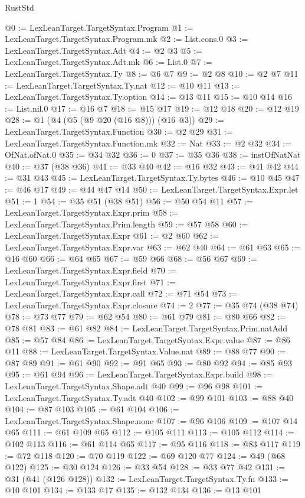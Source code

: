 \begin{lexlean}{RustStd}
\begin{coremodule}
@0 := LexLeanTarget.TargetSyntax.Program
@1 := LexLeanTarget.TargetSyntax.Program.mk
@2 := List.cons.{0}
@3 := LexLeanTarget.TargetSyntax.Adt
@4 := @2 @3
@5 := LexLeanTarget.TargetSyntax.Adt.mk
@6 := List.{0}
@7 := LexLeanTarget.TargetSyntax.Ty
@8 := @6 @7
@9 := @2 @8
@10 := @2 @7
@11 := LexLeanTarget.TargetSyntax.Ty.nat
@12 := @10 @11
@13 := LexLeanTarget.TargetSyntax.Ty.option
@14 := @13 @11
@15 := @10 @14
@16 := List.nil.{0}
@17 := @16 @7
@18 := @15 @17
@19 := @12 @18
@20 := @12 @19
@28 := @1 (@4 (@5 (@9 @20 (@16 @8))) (@16 @3))
@29 := LexLeanTarget.TargetSyntax.Function
@30 := @2 @29
@31 := LexLeanTarget.TargetSyntax.Function.mk
@32 := Nat
@33 := @2 @32
@34 := OfNat.ofNat.{0}
@35 := @34 @32
@36 := 0
@37 := @35 @36
@38 := instOfNatNat
@40 := @37 (@38 @36)
@41 := @33 @40
@42 := @16 @32
@43 := @41 @42
@44 := @31 @43
@45 := LexLeanTarget.TargetSyntax.Ty.bytes
@46 := @10 @45
@47 := @46 @17
@49 := @44 @47 @14
@50 := LexLeanTarget.TargetSyntax.Expr.let
@51 := 1
@54 := @35 @51 (@38 @51)
@56 := @50 @54 @11
@57 := LexLeanTarget.TargetSyntax.Expr.prim
@58 := LexLeanTarget.TargetSyntax.Prim.length
@59 := @57 @58
@60 := LexLeanTarget.TargetSyntax.Expr
@61 := @2 @60
@62 := LexLeanTarget.TargetSyntax.Expr.var
@63 := @62 @40
@64 := @61 @63
@65 := @16 @60
@66 := @64 @65
@67 := @59 @66
@68 := @56 @67
@69 := LexLeanTarget.TargetSyntax.Expr.field
@70 := LexLeanTarget.TargetSyntax.Expr.first
@71 := LexLeanTarget.TargetSyntax.Expr.call
@72 := @71 @54
@73 := LexLeanTarget.TargetSyntax.Expr.closure
@74 := 2
@77 := @35 @74 (@38 @74)
@78 := @73 @77
@79 := @62 @54
@80 := @61 @79
@81 := @80 @66
@82 := @78 @81
@83 := @61 @82
@84 := LexLeanTarget.TargetSyntax.Prim.natAdd
@85 := @57 @84
@86 := LexLeanTarget.TargetSyntax.Expr.value
@87 := @86 @11
@88 := LexLeanTarget.TargetSyntax.Value.nat
@89 := @88 @77
@90 := @87 @89
@91 := @61 @90
@92 := @91 @65
@93 := @80 @92
@94 := @85 @93
@95 := @61 @94
@96 := LexLeanTarget.TargetSyntax.Expr.build
@98 := LexLeanTarget.TargetSyntax.Shape.adt @40
@99 := @96 @98
@101 := LexLeanTarget.TargetSyntax.Ty.adt @40
@102 := @99 @101
@103 := @88 @40
@104 := @87 @103
@105 := @61 @104
@106 := LexLeanTarget.TargetSyntax.Shape.none
@107 := @96 @106
@109 := @107 @14 @65
@111 := @61 @109 @65
@112 := @105 @111
@113 := @105 @112
@114 := @102 @113
@116 := @61 @114 @65
@117 := @95 @116
@118 := @83 @117
@119 := @72 @118
@120 := @70 @119
@122 := @69 @120 @77
@124 := @49 (@68 @122)
@125 := @30 @124
@126 := @33 @54
@128 := @33 @77 @42
@131 := @31 (@41 (@126 @128))
@132 := LexLeanTarget.TargetSyntax.Ty.fn
@133 := @10 @101
@134 := @133 @17
@135 := @132 @134
@136 := @13 @101

\end{coremodule}
\end{lexlean}
